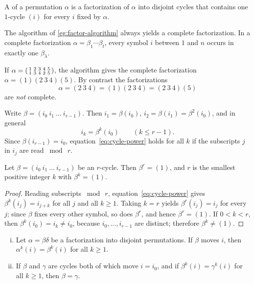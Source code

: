 \begin{definition}
	A  of a permutation \(\alpha\) is a factorization of
	\(\alpha\) into disjoint cycles that contains one \(1\)-cycle \((i)\) for every \(i\)
	fixed by \(\alpha\).
\end{definition}

The algorithm of \autoref{eg:factor-algorithm} always yields a complete factorization. In
a complete factorization \(\alpha = \beta_1\cdots\beta_t\), every symbol \(i\) between
\(1\) and \(n\) occurs in exactly one \(\beta_\lambda\).

\begin{eg}
	If \(\alpha = \begin{psmallmatrix} 1&2&3&4&5 \\ 1&3&4&2&5 \end{psmallmatrix}\), the
	algorithm gives the complete factorization \(\alpha = (1)(2\ 3\ 4)(5)\). By contrast the
	factorizations
	\[
		\alpha = (2\ 3\ 4) = (1)(2\ 3\ 4) = (2\ 3\ 4)(5)
	\]
	are \emph{not} complete.
\end{eg}

Write \(\beta = (i_0\ i_1\ \dots\ i_{r-1})\). Then \(i_1 = \beta(i_0)\),
\(i_2 = \beta(i_1) = \beta^2(i_0)\), and in general
\begin{equation}\label{eq:cycle-power}
	i_k = \beta^k(i_0) \qquad (k \leq r-1).
\end{equation}
Since \(\beta(i_{r-1}) = i_0\), equation~\eqref{eq:cycle-power} holds for all \(k\) if the
subscripts \(j\) in \(i_j\) are read \(\bmod\ r\).

\begin{lemma}\label{lem:cycle-order}
	Let \(\beta = (i_0\ i_1\ \dots\ i_{r-1})\) be an \(r\)-cycle. Then \(\beta^r = (1)\),
	and \(r\) is the smallest positive integer \(k\) with \(\beta^k = (1)\).
\end{lemma}

\begin{proof}
	Reading subscripts \(\bmod\ r\), equation~\eqref{eq:cycle-power} gives
	\(\beta^k(i_j) = i_{j+k}\) for all \(j\) and all \(k \geq 1\). Taking \(k = r\) yields
	\(\beta^r(i_j) = i_j\) for every \(j\); since \(\beta\) fixes every other symbol, so
	does \(\beta^r\), and hence \(\beta^r = (1)\). If \(0 < k < r\), then
	\(\beta^k(i_0) = i_k \neq i_0\), because \(i_0, \dots, i_{r-1}\) are distinct;
	therefore \(\beta^k \neq (1)\).
\end{proof}

\begin{lemma}\label{lem:cycle-powers}
	\begin{enumerate}[(i)]
		\item Let \(\alpha = \beta\delta\) be a factorization into disjoint permutations. If
		      \(\beta\) moves \(i\), then \(\alpha^k(i) = \beta^k(i)\) for all \(k \geq 1\).
		\item If \(\beta\) and \(\gamma\) are cycles both of which move \(i = i_0\), and if
		      \(\beta^k(i) = \gamma^k(i)\) for all \(k \geq 1\), then \(\beta = \gamma\).
	\end{enumerate}
\end{lemma}

